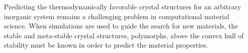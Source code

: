 %



%
Predicting the thermodynamically favorable crystal structures for an arbitrary inorganic system remains a challenging problem in computational material science.\cite{Woodley2008}
%
%
When simulations are used to guide the search for new materials, the stable and meta-stable crystal structures,  polymorphs,  above the convex hull of stability must be known in order to predict the material properties.
